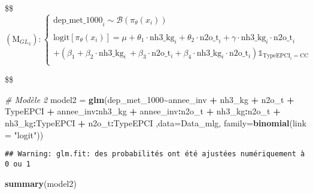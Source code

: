 \documentclass[
]{article}
\newenvironment{Shaded}{\begin{snugshade}}{\end{snugshade}}
\newcommand{\AttributeTok}[1]{\textcolor[rgb]{0.13,0.29,0.53}{#1}}
\newcommand{\CommentTok}[1]{\textcolor[rgb]{0.56,0.35,0.01}{\textit{#1}}}
\newcommand{\FunctionTok}[1]{\textcolor[rgb]{0.13,0.29,0.53}{\textbf{#1}}}
\newcommand{\NormalTok}[1]{#1}
\newcommand{\OtherTok}[1]{\textcolor[rgb]{0.56,0.35,0.01}{#1}}
\newcommand{\SpecialCharTok}[1]{\textcolor[rgb]{0.81,0.36,0.00}{\textbf{#1}}}
\newcommand{\StringTok}[1]{\textcolor[rgb]{0.31,0.60,0.02}{#1}}
\begin{document}
\$\$ \begin{equation*}
(\text{M}_{GL_{3}}) : 

\begin{cases}
\text{dep_met_1000}_i \sim \mathcal{B}(\pi_\theta(x_i)) \\

\\

\text{logit}[\pi_\theta(x_i)] = \mu  +  \theta_1\cdot\text{nh3_kg}_i  + \theta_2\cdot\text{n2o_t}_i  +  \gamma\cdot\text{nh3_kg}_i\cdot\text{n2o_t}_i  \\ 
  + (\beta_1  +  \beta_2\cdot\text{nh3_kg}_i ~ + \beta_3\cdot\text{n2o_t}_i + \beta_4\cdot\text{nh3_kg}_i\cdot\text{n2o_t}_i )\mathbb{1}_{\text{TypeEPCI}_i = \text{CC}} \\

\end{cases}

\end{equation*}

\$\$

\begin{Shaded}
\begin{Highlighting}[]
\CommentTok{\# Modèle 2}
\NormalTok{model2 }\OtherTok{=} \FunctionTok{glm}\NormalTok{(dep\_met\_1000}\SpecialCharTok{\textasciitilde{}}\NormalTok{annee\_inv }\SpecialCharTok{+}\NormalTok{ nh3\_kg }\SpecialCharTok{+}\NormalTok{ n2o\_t }\SpecialCharTok{+}\NormalTok{ TypeEPCI }\SpecialCharTok{+}\NormalTok{ annee\_inv}\SpecialCharTok{:}\NormalTok{nh3\_kg }\SpecialCharTok{+} 
\NormalTok{    annee\_inv}\SpecialCharTok{:}\NormalTok{n2o\_t }\SpecialCharTok{+}\NormalTok{ nh3\_kg}\SpecialCharTok{:}\NormalTok{n2o\_t }\SpecialCharTok{+}\NormalTok{ nh3\_kg}\SpecialCharTok{:}\NormalTok{TypeEPCI }\SpecialCharTok{+}\NormalTok{ n2o\_t}\SpecialCharTok{:}\NormalTok{TypeEPCI ,}\AttributeTok{data=}\NormalTok{Data\_mlg, }\AttributeTok{family=}\FunctionTok{binomial}\NormalTok{(}\AttributeTok{link =} \StringTok{"logit"}\NormalTok{))}
\end{Highlighting}
\end{Shaded}

\begin{verbatim}
## Warning: glm.fit: des probabilités ont été ajustées numériquement à 0 ou 1
\end{verbatim}

\begin{Shaded}
\begin{Highlighting}[]
\FunctionTok{summary}\NormalTok{(model2)}
\end{Highlighting}
\end{Shaded}
\end{document}
